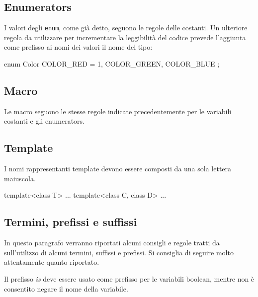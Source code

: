 \subsection{Enumerators}\label{ssec:enumname}

I valori degli \texttt{enum}, come già detto, seguono le regole delle costanti.
Un ulteriore regola da utilizzare per incrementare la leggibilità del codice prevede l'aggiunta come prefisso ai nomi dei valori il nome del tipo:

\noindent\begin{minipage}[t]{\rbwidth}
\begin{RightCode}
enum Color
{
	COLOR_RED = 1,
	COLOR_GREEN,
	COLOR_BLUE
};
\end{RightCode}
\end{minipage}

\subsection{Macro}\label{ssec:macroname}

Le macro seguono le stesse regole indicate precedentemente per le variabili costanti e gli enumerators.

\subsection{Template}\label{ssec:templatename}

I nomi rappresentanti template devono essere composti da una sola lettera maiuscola.

\noindent\begin{minipage}[t]{\rbwidth}
\begin{RightCode}
template<class T> ...
template<class C, class D> ...
\end{RightCode}
\end{minipage}

\subsection{Termini, prefissi e suffissi}\label{ssec:prefixsuffix}

In questo paragrafo verranno riportati alcuni consigli e regole tratti da \cite{codestyle:geotechnical} sull'utilizzo di alcuni termini, suffissi e prefissi.
Si consiglia di seguire molto attentamente quanto riportato.%

Il prefisso \emph{is} deve essere usato come prefisso per le variabili boolean, mentre non è consentito negare il nome della variabile.

